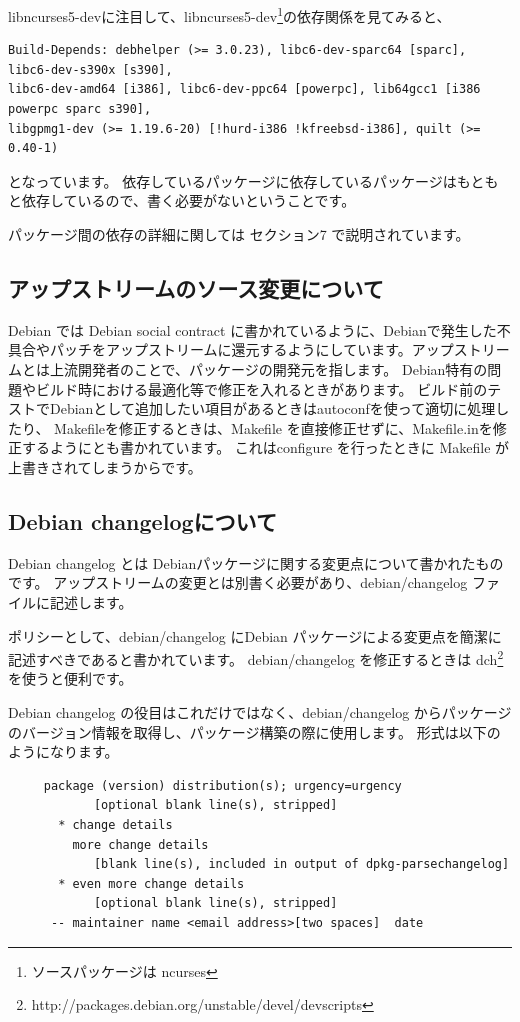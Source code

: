 \documentclass[mingoth,a4paper]{jsarticle}
\begin{document}
libncurses5-devに注目して、libncurses5-dev\footnote{ソースパッケージは ncurses }の依存関係を見てみると、
\begin{verbatim}
Build-Depends: debhelper (>= 3.0.23), libc6-dev-sparc64 [sparc], libc6-dev-s390x [s390], 
libc6-dev-amd64 [i386], libc6-dev-ppc64 [powerpc], lib64gcc1 [i386 powerpc sparc s390], 
libgpmg1-dev (>= 1.19.6-20) [!hurd-i386 !kfreebsd-i386], quilt (>= 0.40-1)
\end{verbatim}
となっています。
依存しているパッケージに依存しているパッケージはもともと依存しているので、書く必要がないということです。

パッケージ間の依存の詳細に関しては セクション7 で説明されています。

\subsection{アップストリームのソース変更について}
Debian では Debian social contract に書かれているように、Debianで発生した不具合やパッチをアップストリームに還元するようにしています。アップストリームとは上流開発者のことで、パッケージの開発元を指します。
Debian特有の問題やビルド時における最適化等で修正を入れるときがあります。
ビルド前のテストでDebianとして追加したい項目があるときはautoconfを使って適切に処理したり、
Makefileを修正するときは、Makefile を直接修正せずに、Makefile.inを修正するようにとも書かれています。
これはconfigure を行ったときに Makefile が上書きされてしまうからです。

\subsection{Debian changelogについて}
Debian changelog とは Debianパッケージに関する変更点について書かれたものです。
アップストリームの変更とは別書く必要があり、debian/changelog ファイルに記述します。

ポリシーとして、debian/changelog にDebian パッケージによる変更点を簡潔に記述すべきであると書かれています。
debian/changelog を修正するときは dch\footnote{http://packages.debian.org/unstable/devel/devscripts}を使うと便利です。

Debian changelog の役目はこれだけではなく、debian/changelog からパッケージのバージョン情報を取得し、パッケージ構築の際に使用します。
形式は以下のようになります。

\begin{verbatim}
     package (version) distribution(s); urgency=urgency
     	    [optional blank line(s), stripped]
       * change details
         more change details
     	    [blank line(s), included in output of dpkg-parsechangelog]
       * even more change details
     	    [optional blank line(s), stripped]
      -- maintainer name <email address>[two spaces]  date
\end{verbatim}
\end{document}
